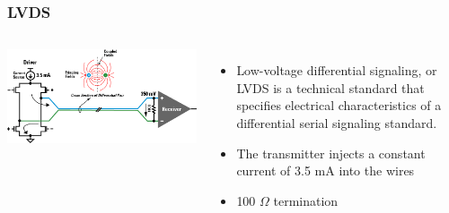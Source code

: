 \documentclass[aspectratio=169]{beamer}
\begin{document}
	\begin{frame}
		\frametitle{LVDS}
		\begin{columns}
			\begin{center}
				\includegraphics[width=0.95 \textwidth]{IMG/LVDS.png}
			\end{center}
			\begin{itemize}
				\item Low-voltage differential signaling, or LVDS is a technical standard that specifies electrical characteristics of a differential serial signaling standard.
				\item The transmitter injects a constant current of 3.5 mA into the wires
				\item 100 $\Omega$ termination
			\end{itemize}
		\end{columns}
	\end{frame}

\end{document}
